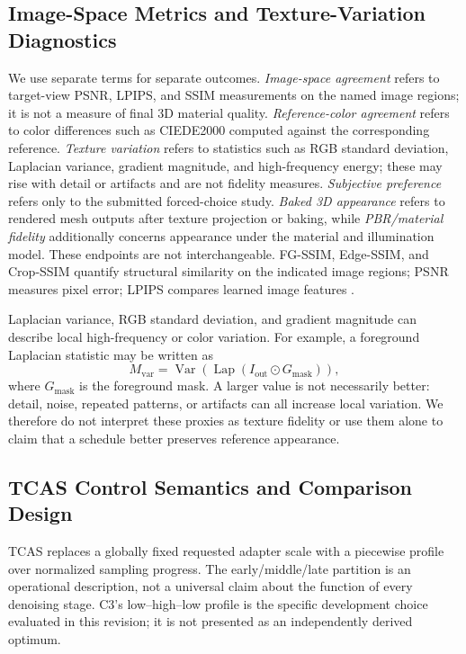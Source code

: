 \documentclass[times,twocolumn,final]{elsarticle}
\begin{document}
\subsection{Image-Space Metrics and Texture-Variation Diagnostics}
\label{subsec:metrics}

We use separate terms for separate outcomes. \emph{Image-space agreement} refers to target-view PSNR, LPIPS, and SSIM measurements on the named image regions; it is not a measure of final 3D material quality. \emph{Reference-color agreement} refers to color differences such as CIEDE2000 computed against the corresponding reference. \emph{Texture variation} refers to statistics such as RGB standard deviation, Laplacian variance, gradient magnitude, and high-frequency energy; these may rise with detail or artifacts and are not fidelity measures. \emph{Subjective preference} refers only to the submitted forced-choice study. \emph{Baked 3D appearance} refers to rendered mesh outputs after texture projection or baking, while \emph{PBR/material fidelity} additionally concerns appearance under the material and illumination model. These endpoints are not interchangeable. FG-SSIM, Edge-SSIM, and Crop-SSIM quantify structural similarity on the indicated image regions; PSNR measures pixel error; LPIPS compares learned image features \cite{wang2004ssim,zhang2018lpips}.

Laplacian variance, RGB standard deviation, and gradient magnitude can describe local high-frequency or color variation. For example, a foreground Laplacian statistic may be written as
\begin{equation}
M_{\mathrm{var}}=\operatorname{Var}\!\left(\operatorname{Lap}(I_{\mathrm{out}}\odot G_{\mathrm{mask}})\right),
\end{equation}
where $G_{\mathrm{mask}}$ is the foreground mask. A larger value is not necessarily better: detail, noise, repeated patterns, or artifacts can all increase local variation. We therefore do not interpret these proxies as texture fidelity or use them alone to claim that a schedule better preserves reference appearance.

\subsection{TCAS Control Semantics and Comparison Design}
\label{subsec:tcas}

TCAS replaces a globally fixed requested adapter scale with a piecewise profile over normalized sampling progress. The early/middle/late partition is an operational description, not a universal claim about the function of every denoising stage. C3's low--high--low profile is the specific development choice evaluated in this revision; it is not presented as an independently derived optimum.
\end{document}
